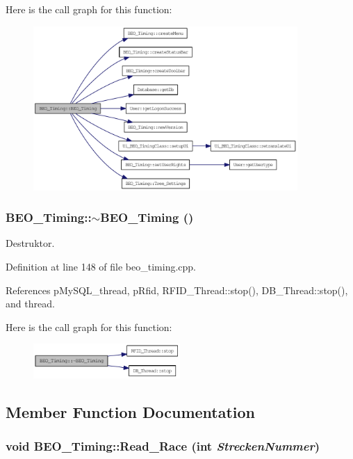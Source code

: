 Here is the call graph for this function:\nopagebreak
\begin{figure}[H]
\begin{center}
\leavevmode
\includegraphics[width=285pt]{class_b_e_o___timing_1adf7a002a9712fefe2f68007d2112e9_cgraph}
\end{center}
\end{figure}
\hypertarget{class_b_e_o___timing_1a251548e7f861c3a74fe34941586519}{
\subsubsection[$\sim$BEO\_\-Timing]{\setlength{\rightskip}{0pt plus 5cm}BEO\_\-Timing::$\sim$BEO\_\-Timing ()}}
\label{class_b_e_o___timing_1a251548e7f861c3a74fe34941586519}


Destruktor. 



Definition at line 148 of file beo\_\-timing.cpp.

References pMySQL\_\-thread, pRfid, RFID\_\-Thread::stop(), DB\_\-Thread::stop(), and thread.

Here is the call graph for this function:\nopagebreak
\begin{figure}[H]
\begin{center}
\leavevmode
\includegraphics[width=158pt]{class_b_e_o___timing_1a251548e7f861c3a74fe34941586519_cgraph}
\end{center}
\end{figure}


\subsection{Member Function Documentation}
\hypertarget{class_b_e_o___timing_b54fe6db69d9304c6c27bf3b4c253196}{
\subsubsection[Read\_\-Race]{\setlength{\rightskip}{0pt plus 5cm}void BEO\_\-Timing::Read\_\-Race (int {\em StreckenNummer})}}
\label{class_b_e_o___timing_b54fe6db69d9304c6c27bf3b4c253196}


